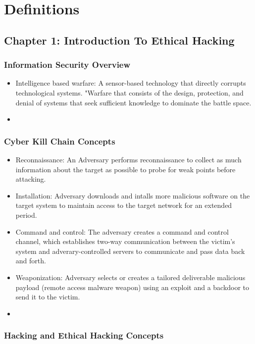 \section{Definitions}

\subsection{Chapter 1: Introduction To Ethical Hacking}
\subsubsection{Information Security Overview}
\begin{itemize}
    \item Intelligence based warfare: A sensor-based technology that directly corrupts technological systems. "Warfare that consists of the design, protection, and denial of systems that seek sufficient knowledge to dominate the battle space.
    \item
\end{itemize}

\subsubsection{Cyber Kill Chain Concepts}
\begin{itemize}
    \item Reconnaissance: An Adversary performs reconnaissance to collect as much information about the target as possible to probe for weak points before attacking.
    \item Installation: Adversary downloads and intalls more malicious software on the target system to maintain access to the target network for an extended period.
    \item Command and control: The adversary creates a command and control channel, which establishes two-way communication between the victim's system and adverary-controlled servers to communicate and pass data back and forth.
    \item Weaponization: Adversary selects or creates a tailored deliverable malicious payload (remote access malware weapon) using an exploit and a backdoor to send it to the victim.
    \item
\end{itemize}
\subsubsection{Hacking and Ethical Hacking Concepts}

